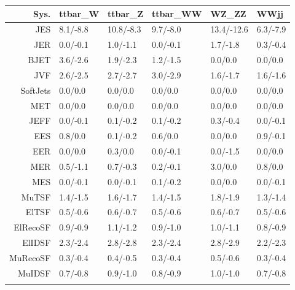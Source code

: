 \begin{tabular}{r|p{.08\linewidth}p{.08\linewidth}p{.08\linewidth}p{.08\linewidth}p{.08\linewidth}}
\toprule
 Sys.  & ttbar\_W & ttbar\_Z & ttbar\_WW & WZ\_ZZ & WWjj \\
\toprule
JES  & 8.1/-8.8 & 10.8/-8.3 & 9.7/-8.0 & 13.4/-12.6 & 6.3/-7.9 \\
JER  & 0.0/-0.1 & 1.0/-1.1 & 0.0/-0.1 & 1.7/-1.8 & 0.3/-0.4 \\
BJET  & 3.6/-2.6 & 1.9/-2.3 & 1.2/-1.5 & 0.0/0.0 & 0.0/0.0 \\
JVF  & 2.6/-2.5 & 2.7/-2.7 & 3.0/-2.9 & 1.6/-1.7 & 1.6/-1.6 \\
SoftJets  & 0.0/0.0 & 0.0/0.0 & 0.0/0.0 & 0.0/0.0 & 0.0/0.0 \\
MET  & 0.0/0.0 & 0.0/0.0 & 0.0/0.0 & 0.0/0.0 & 0.0/0.0 \\
JEFF  & 0.0/-0.1 & 0.1/-0.2 & 0.1/-0.2 & 0.3/-0.4 & 0.0/-0.1 \\
EES  & 0.8/0.0 & 0.1/-0.2 & 0.6/0.0 & 0.0/0.0 & 0.9/-0.1 \\
EER  & 0.0/0.0 & 0.3/0.0 & 0.0/-0.1 & 0.0/-1.5 & 0.0/0.0 \\
MER  & 0.5/-1.1 & 0.7/-0.3 & 0.2/-0.1 & 3.0/0.0 & 0.8/0.0 \\
MES  & 0.0/-0.1 & 0.0/-0.1 & 0.1/-0.2 & 0.0/0.0 & 0.0/-0.1 \\
MuTSF  & 1.4/-1.5 & 1.6/-1.7 & 1.4/-1.5 & 1.8/-1.9 & 1.3/-1.4 \\
ElTSF  & 0.5/-0.6 & 0.6/-0.7 & 0.5/-0.6 & 0.6/-0.7 & 0.5/-0.6 \\
ElRecoSF  & 0.9/-0.9 & 1.1/-1.2 & 0.9/-1.0 & 1.0/-1.1 & 0.8/-0.9 \\
ElIDSF  & 2.3/-2.4 & 2.8/-2.8 & 2.3/-2.4 & 2.8/-2.9 & 2.2/-2.3 \\
MuRecoSF  & 0.3/-0.4 & 0.4/-0.5 & 0.3/-0.4 & 0.5/-0.6 & 0.3/-0.4 \\
MuIDSF  & 0.7/-0.8 & 0.9/-1.0 & 0.8/-0.9 & 1.0/-1.0 & 0.7/-0.8 \\
 \\
\bottomrule
\end{tabular}
